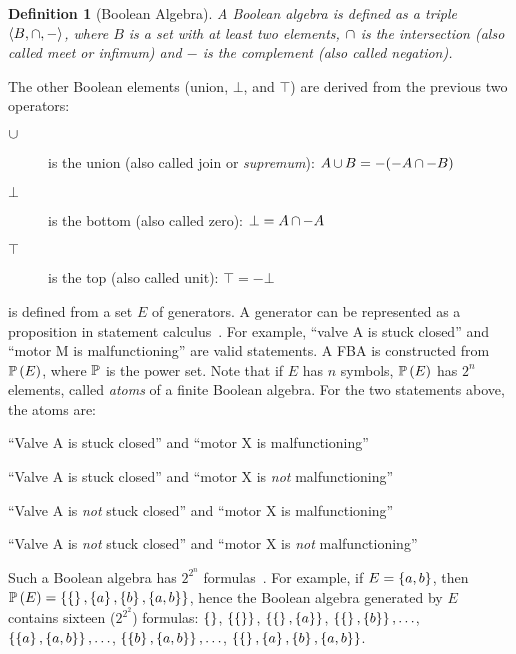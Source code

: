 \documentclass[12pt,openright,twoside,a4paper,oldfontcommands,english,brazil,final]{abntex2}
\newtheorem{definition}{Definition}[chapter]
\theoremstyle{theo}
\newcommand{\setsin}[1]{\ensuremath\left\{ #1 \right\}}
\newcommand{\anglesin}[1]{\ensuremath\left\langle #1 \right\rangle}
\def\union{\ensuremath\operatorname{\cup}}
\def\inter{\ensuremath\operatorname{\cap}}
\def\powersetop{\ensuremath\mathbb{P}}
\newcommand{\powerset}[1]{\ensuremath\powersetop\left(#1\right)}
\begin{document}
\begin{definition}[Boolean Algebra]
\label{def:boolean-algebra}
A Boolean algebra is defined as a triple $\anglesin{B, \inter, -}$, where $B$ is a set with at least two elements, $\inter$ is the intersection (also called meet or \emph{infimum}) and $-$ is the complement (also called negation).
\end{definition}
%
\noindent The other Boolean elements (union, $\bot$, and $\top$) are derived from the previous two operators:
\begin{description}
  \item[$\union$] is the union (also called join or \emph{supremum}): $A \union B = -(-A \inter -B)$
  \item [$\bot$] is the bottom (also called zero): $\bot = A \inter -A$
  \item [$\top$] is the top (also called unit): $\top = -\bot$
\end{description}

\begin{sloppypar}
 is defined from a set $E$ of generators.
A generator can be represented as a proposition in statement calculus~\cite[p. 274]{Stoll1979}.
For example, ``valve A is stuck closed'' and ``motor M is malfunctioning'' are valid statements.
A \acl{FBA} is constructed from $\powerset{E}$, where $\powersetop$ is the power set.
Note that if $E$ has $n$ symbols, $\powerset{E}$ has $2^{n}$ elements, called \emph{atoms} of a finite Boolean algebra.
For the two statements above, the atoms are:
\begin{alineas}
  \item ``Valve A is stuck closed'' and ``motor X is malfunctioning''
  \item ``Valve A is stuck closed'' and ``motor X is \emph{not} malfunctioning''
  \item ``Valve A is \emph{not} stuck closed'' and ``motor X is malfunctioning''
  \item ``Valve A is \emph{not} stuck closed'' and ``motor X is \emph{not} malfunctioning''
\end{alineas}
Such a Boolean algebra has $2^{2^{n}}$ formulas~\cite[p. 261]{GH2009}.
For example, if $E = \setsin{a,b}$, then $\powerset{E} = \setsin{ \setsin{}, \setsin{a}, \setsin{b}, \setsin{a,b} }$, hence the Boolean algebra generated by $E$ contains sixteen ($2^{2^{2}}$) formulas:
$\setsin{}$,
$\setsin{\setsin{}}$,
$\setsin{\setsin{}, \setsin{a}}$,
$\setsin{\setsin{}, \setsin{b}}, \ldots$,
$\setsin{\setsin{a}, \setsin{a,b}}, \ldots$,
$\setsin{\setsin{b}, \setsin{a,b}}, \ldots$,
$\setsin{\setsin{}, \setsin{a}, \setsin{b}, \setsin{a,b}}$.
\end{sloppypar}
\end{document}
